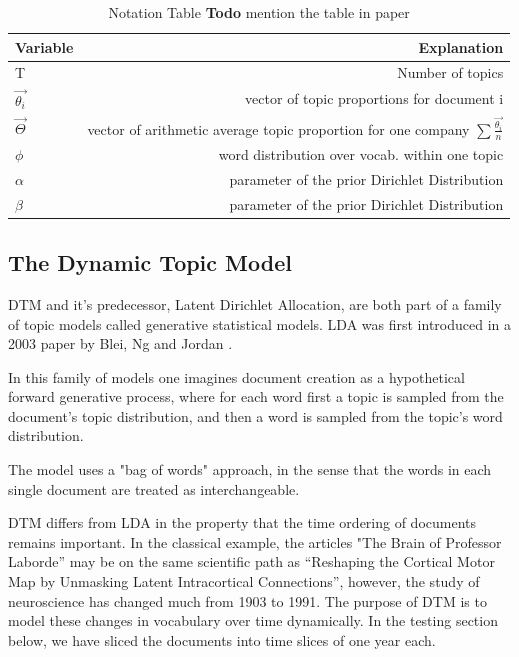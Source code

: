 \documentclass[12pt,journal,letterpaper,oneside,onecolumn]{IEEEtran}
\begin{document}
\begin{table}
  \begin{center}
    \caption{Notation Table \textbf{Todo} mention the table in paper}
    \label{tabl_notations}
    \begin{tabular}{l|r} %
      \textbf{Variable} & \textbf{Explanation}\\
      \hline
      T & Number of topics\\
      $\vec{\theta_i}$ \ & vector of topic proportions for document i\\
      $\vec{\Theta}$ & vector of arithmetic average topic proportion for one company $\sum{\frac{\vec{\theta_i}}{n}}$ \\
      $\phi$ & word distribution over vocab. within one topic\\
      $\alpha$ & parameter of the prior Dirichlet Distribution \\
      $\beta$ & parameter of the prior Dirichlet Distribution \\

    \end{tabular}
  \end{center}
\end{table}


\subsection{The Dynamic Topic Model}
DTM \cite{BleiLafferty2006} and it's predecessor, Latent Dirichlet Allocation, are both part of a family of topic models called generative statistical models. LDA was first introduced in a 2003 paper by Blei, Ng and Jordan \cite{BleiJordan2003}.

In this family of models one imagines document creation as a hypothetical forward generative process, where for each word first a topic is sampled from the document's topic distribution, and then a word is sampled from the topic's word distribution.

The model uses a "bag of words" approach, in the sense that the words in each single document are treated as interchangeable. 

DTM differs from LDA in the property that the time ordering of documents remains important. In the classical example, the articles "The Brain of Professor Laborde” may be on the same scientific path as “Reshaping the Cortical Motor Map by Unmasking Latent Intracortical Connections”, however, the study of neuroscience has changed much from 1903 to 1991.
The purpose of DTM is to model these changes in vocabulary over time dynamically.
In the testing section below, we have sliced the documents into time slices of one year each.
\end{document}

